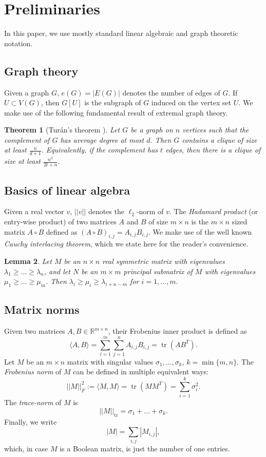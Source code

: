 \documentclass[11pt]{amsart}
\theoremstyle{plain}
\newtheorem{theorem}{Theorem}[section]
\newtheorem{lemma}[theorem]{Lemma}
\theoremstyle{definition}
\DeclareMathOperator{\tr}{tr}
\begin{document}
\section{Preliminaries}
In this paper, we use mostly standard linear algebraic and graph theoretic notation. 

\subsection{Graph theory} Given a graph $G$, $e(G)=|E(G)|$ denotes the number of edges of $G$. If $U\subset V(G)$, then $G[U]$ is the subgraph of $G$ induced on the vertex set $U$. We make use of the following fundamental result of extremal graph theory.

\begin{theorem}[Tur\'an's theorem \cite{turan}]\label{thm:turan}
    Let $G$ be a graph on $n$ vertices such that the complement of $G$ has average degree at most $d$. Then $G$ contains a clique of size at least
    $\frac{n}{d+1}.$
    Equivalently, if the complement has $t$ edges, then there is a clique of size  at least
    $\frac{n^2}{2t+n}.$
\end{theorem}

\subsection{Basics of linear algebra} Given a real vector $v$, $||v||$ denotes the $\ell_2$-norm of $v$. The \emph{Hadamard product} (or entry-wise product) of two matrices $A$ and $B$ of size $m\times n$ is the $m\times n$ sized matrix $A\circ B$ defined as $(A\circ B)_{i,j}=A_{i,j}B_{i,j}$. We make use of the well known \emph{Cauchy interlacing theorem}, which we state here for the reader's convenience.

\begin{lemma}\label{lemma:cauchy}
Let $M$ be an $n\times n$ real symmetric matrix with eigenvalues $\lambda_1\geq \dots\geq \lambda_n$, and let $N$ be an $m\times m$ principal submatrix of $M$ with eigenvalues $\mu_1\geq \dots\geq \mu_m$. Then $\lambda_i\geq \mu_i\geq \lambda_{i+n-m}$ for $i=1,\dots,m$.
\end{lemma}

\subsection{Matrix norms}
Given two matrices $A,B\in \mathbb{R}^{m\times n}$, their Frobenius inner product is defined as $$\langle A,B\rangle=\sum_{i=1}^m\sum_{j=1}^n A_{i,j}B_{i,j}=\tr(AB^T).$$ Let $M$ be an $m\times n$ matrix with singular values $\sigma_1,\dots,\sigma_k$, $k=\min\{m,n\}$. The \emph{Frobenius norm} of $M$ can be defined in multiple equivalent ways: $$||M||_F^2:=\langle M,M\rangle=\tr(MM^T)=\sum_{i=1}^{k}\sigma_i^2.$$ The \emph{trace-norm} of $M$ is $$||M||_{\tr}=\sigma_1+\dots+\sigma_k.$$ Finally, we write $$|M|=\sum_{i,j}|M_{i,j}|,$$ which, in case $M$ is a Boolean matrix, is just the number of one entries.
\end{document}
